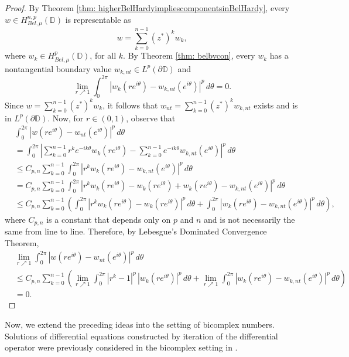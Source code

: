 \documentclass[12pt,reqno]{amsart}
\theoremstyle{definition}
\theoremstyle{remark}
\newcommand{\p}{\partial}
\newcommand{\disk}{\mathbb{D}}
\begin{document}
\begin{proof}

    By Theorem \ref{thm: higherBelHardyimpliescomponentsinBelHardy}, every $w \in H^{n,p}_{Bel,\mu}(\disk)$ is representable as 
    \[
        w = \sum_{k=0}^{n-1} (z^*)^k w_k,
    \]
    where $w_k \in H^p_{Bel,\mu}(\disk)$, for all $k$. By Theorem \ref{thm: belbvcon}, every $w_k$ has a nontangential boundary value $w_{k,nt} \in L^p(\p \disk)$ and 
    \[
        \lim_{r\nearrow 1} \int_0^{2\pi} |w_k(re^{i\theta})- w_{k,nt}(e^{i\theta})|^p\,d\theta = 0.
    \]
    Since $w = \sum_{k=0}^{n-1} (z^*)^k w_k$, it follows that $w_{nt} = \sum_{k=0}^{n-1} (z^*)^k w_{k,nt}$ exists and is in $L^p(\p\disk)$. Now, for $r \in (0,1)$, observe that 
    \begin{align*}
        &  \int_0^{2\pi} |w(re^{i\theta})- w_{nt}(e^{i\theta})|^p\,d\theta\\
        &=  \int_0^{2\pi} \left|\sum_{k=0}^{n-1} r^k e^{-ik\theta} w_k(re^{i\theta})- \sum_{k=0}^{n-1} e^{-ik\theta} w_{k,nt}(e^{i\theta}) \right|^p\,d\theta\\
        &\leq C_{p,n} \sum_{k=0}^{n-1} \int_0^{2\pi} |r^k w_k(re^{i\theta}) - w_{k,nt}(e^{i\theta})|^p \,d\theta\\
        &= C_{p,n} \sum_{k=0}^{n-1} \int_0^{2\pi} |r^k w_k(re^{i\theta}) - w_k(re^{i\theta}) + w_k(re^{i\theta})- w_{k,nt}(e^{i\theta})|^p \,d\theta\\
        &\leq C_{p,n} \sum_{k=0}^{n-1} \left( \int_0^{2\pi} |r^k w_k(re^{i\theta}) - w_k(re^{i\theta})|^p \,d\theta+ \int_0^{2\pi} |w_k(re^{i\theta})- w_{k,nt}(e^{i\theta})|^p \,d\theta \right),
    \end{align*}
    where $C_{p,n}$ is a constant that depends only on $p$ and $n$ and is not necessarily the same from line to line. Therefore, by Lebesgue's Dominated Convergence Theorem, 
    \begin{align*}
       & \lim_{r\nearrow 1} \int_0^{2\pi} |w(re^{i\theta})- w_{nt}(e^{i\theta})|^p\,d\theta \\
       & \leq C_{p,n} \sum_{k=0}^{n-1} \left( \lim_{r\nearrow 1} \int_0^{2\pi} |r^k-1|^p \,|w_k(re^{i\theta}) |^p \,d\theta+ \lim_{r\nearrow 1}\int_0^{2\pi} |w_k(re^{i\theta})- w_{k,nt}(e^{i\theta})|^p \,d\theta \right) \\
       &= 0.
    \end{align*}
    

\end{proof}

Now, we extend the preceding ideas into the setting of bicomplex numbers. Solutions of differential equations constructed by iteration of the differential operator were previously considered in the bicomplex setting in \cite{BCAtomic, BCHoiv}.
\end{document}

